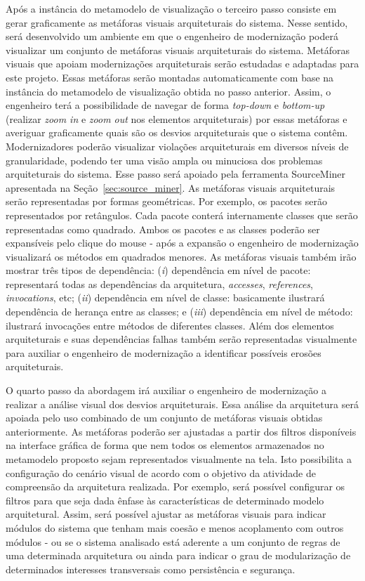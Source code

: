 \documentclass[12pt]{article}
\begin{document}
Após a instância do metamodelo de visualização o terceiro passo consiste em gerar graficamente as metáforas visuais arquiteturais do sistema. Nesse sentido, será desenvolvido um ambiente em que o engenheiro de modernização poderá visualizar um conjunto de metáforas visuais arquiteturais do sistema. Metáforas visuais que apoiam modernizações arquiteturais serão estudadas e adaptadas para este projeto. Essas metáforas serão montadas automaticamente com base na instância do metamodelo de visualização obtida no passo anterior. Assim, o engenheiro terá a possibilidade de navegar de forma \textit{top-down} e \textit{bottom-up} (realizar \textit{zoom in} e \textit{zoom out} nos elementos arquiteturais) por essas metáforas e averiguar graficamente quais são os desvios arquiteturais que o sistema contêm. Modernizadores poderão visualizar violações arquiteturais em diversos níveis de granularidade, podendo ter uma visão ampla ou minuciosa dos problemas arquiteturais do sistema. Esse passo será apoiado pela ferramenta SourceMiner~\cite{source_miner_glauco} apresentada na Seção~\ref{sec:source_miner}. As metáforas visuais arquiteturais serão representadas por formas geométricas. Por exemplo, os pacotes serão representados por retângulos. Cada pacote conterá internamente classes que serão representadas como quadrado. Ambos os pacotes e as classes poderão ser expansíveis pelo clique do mouse - após a expansão o engenheiro de modernização visualizará os métodos em quadrados menores. As metáforas visuais também irão mostrar três tipos de dependência: (\textit{i}) dependência em nível de pacote: representará todas as dependências da arquitetura, \textit{accesses}, \textit{references}, \textit{invocations}, etc; (\textit{ii}) dependência em nível de classe: basicamente ilustrará dependência de herança entre as classes; e (\textit{iii}) dependência em nível de método: ilustrará invocações entre métodos de diferentes classes. Além dos elementos arquiteturais e suas dependências falhas também serão representadas visualmente para auxiliar o engenheiro de modernização a identificar possíveis erosões arquiteturais.


O quarto passo da abordagem irá auxiliar o engenheiro de modernização a realizar a análise visual dos desvios arquiteturais. Essa análise da arquitetura será apoiada pelo uso combinado de um conjunto de metáforas visuais obtidas anteriormente. As metáforas poderão ser ajustadas a partir dos filtros disponíveis na interface gráfica de forma que nem todos os elementos armazenados no metamodelo proposto sejam representados visualmente na tela. Isto possibilita a configuração do cenário visual de acordo com o objetivo da atividade de compreensão da arquitetura realizada. Por exemplo, será possível configurar os filtros para que seja dada ênfase às características de determinado modelo arquitetural. Assim, será possível ajustar as metáforas visuais para indicar módulos do sistema que tenham mais coesão e menos acoplamento com outros módulos - ou se o sistema analisado está aderente a um conjunto de regras de uma determinada arquitetura ou ainda para indicar o grau de modularização de determinados interesses transversais como persistência e segurança.
\end{document}
